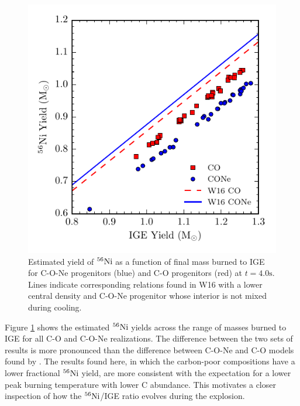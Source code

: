 \documentclass[preprint2]{aastex63}
\newcommand{\Ni}[1]{\ensuremath{{}^{#1}{\rm Ni}}}
\newcommand{\unitstyle}[1]{\ensuremath{\mathrm{#1}}}
\newcommand{\second}{\unitstyle{s}}
\begin{document}
\begin{figure}
\includegraphics[width=\columnwidth]{figures/ni56_v_ige.pdf}
\caption{\label{fig:conversion}
Estimated yield of \Ni{56} as a function of final mass burned to IGE
for C-O-Ne progenitors (blue) and C-O progenitors (red) at
$t = 4.0 \second$.  Lines indicate corresponding relations found in W16 with
a lower central density and C-O-Ne progenitor whose interior is not mixed
during cooling.
}
\end{figure}
Figure \ref{fig:conversion} shows the estimated \Ni{56} yields
across the range of masses burned to IGE
for all C-O and C-O-Ne realizations.
The difference between the two sets of results is more pronounced
than the difference between C-O-Ne and C-O models found by \citet{willcoxetal2016}.
The results found here, in which the carbon-poor compositions have a lower fractional \Ni{56} yield, are more consistent with the expectation for a lower peak burning temperature with lower C abundance.
This motivates a closer inspection of how the \Ni{56}/IGE ratio evolves during the explosion.
\end{document}
